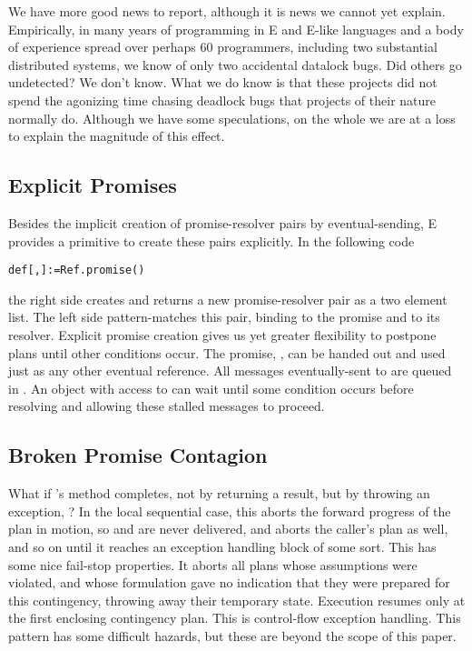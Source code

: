 \documentclass{llncs}
\begin{document}
We have more good news to report, although it is news we cannot yet
explain. Empirically, in many years of programming in E and E-like
languages and a body of experience spread over perhaps 60 programmers,
including two substantial distributed systems, we know of only two
accidental datalock bugs. Did others go undetected? We don't
know. What we do know is that these projects did not spend the
agonizing time chasing deadlock bugs that projects of their nature
normally do. Although we have some speculations, on the whole we are
at a loss to explain the magnitude of this effect.

\subsection{Explicit Promises}

Besides the implicit creation of promise-resolver pairs by
eventual-sending, E provides a primitive to create these pairs
explicitly. In the following code
%
\begin{alltt}
    def [, ] := Ref.promise()
\end{alltt}
%
the right side creates and returns a new promise-resolver pair as a
two element list. The left side pattern-matches this pair, binding
 to the promise and  to its resolver. Explicit promise
creation gives us yet greater flexibility to postpone plans until
other conditions occur. The promise, , can be handed out and
used just as any other eventual reference. All messages
eventually-sent to  are queued in . An object with
access to  can wait until some condition occurs before
resolving  and allowing these stalled messages to proceed.

\subsection{Broken Promise Contagion}

What if 's  method completes, not by
returning a result, but by throwing an exception, ? In the
local sequential case, this aborts the forward progress of the plan in
motion, so  and  are never delivered, and aborts
the caller's plan as well, and so on until it reaches an exception
handling block of some sort. This has some nice fail-stop
properties. It aborts all plans whose assumptions were violated, and
whose formulation gave no indication that they were prepared for this
contingency, throwing away their temporary state. Execution resumes
only at the first enclosing contingency plan. This is control-flow
exception handling. This pattern has some difficult hazards, but these
are beyond the scope of this paper.
\end{document}
